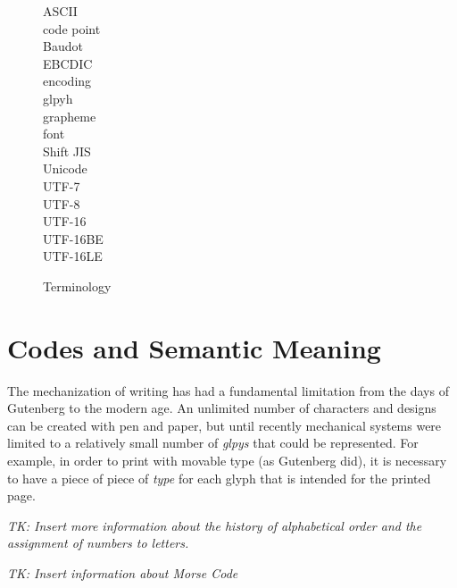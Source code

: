 \begin{figure}
\begin{description}
\item[ASCII]
\item[code point]
\item[Baudot]
\item[EBCDIC]
\item[encoding]
\item[glpyh]
\item[grapheme]
\item[font]
\item[Shift JIS]
\item[Unicode]
\item[UTF-7]
\item[UTF-8]
\item[UTF-16]
\item[UTF-16BE]
\item[UTF-16LE]
\end{description}
\caption{Terminology}
\end{figure}

\section{Codes and Semantic Meaning}

The mechanization of writing has had a fundamental limitation from the
days of Gutenberg to the modern age. An unlimited number of
characters and designs can be created with pen and paper, but until
recently mechanical systems were limited to a relatively small number
of \emph{glpys} that could be represented. For example, in order to
print with movable type (as Gutenberg did), it is necessary to have a
piece of piece of \emph{type} for each glyph that is intended for the
printed page. 


\emph{TK: Insert more information about the history of alphabetical
  order and the assignment of numbers to letters.}

\emph{TK: Insert information about Morse Code}

